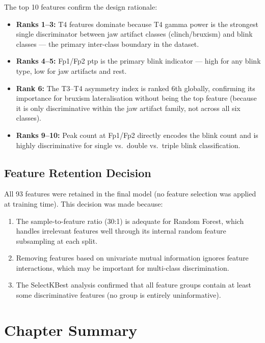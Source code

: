 The top 10 features confirm the design rationale:

\begin{itemize}[leftmargin=*]
    \item \textbf{Ranks 1--3:} T4 features dominate because
    T4 gamma power is the strongest single discriminator
    between jaw artifact classes (clinch/bruxism) and blink
    classes — the primary inter-class boundary in the dataset.
    \item \textbf{Ranks 4--5:} Fp1/Fp2 \acrshort{ptp} is
    the primary blink indicator — high for any blink type,
    low for jaw artifacts and rest.
    \item \textbf{Rank 6:} The T3--T4 asymmetry index is
    ranked 6th globally, confirming its importance for
    bruxism lateralisation without being the top feature
    (because it is only discriminative within the jaw
    artifact family, not across all six classes).
    \item \textbf{Ranks 9--10:} Peak count at Fp1/Fp2
    directly encodes the blink count and is highly
    discriminative for single vs.\ double vs.\ triple
    blink classification.
\end{itemize}

\subsection{Feature Retention Decision}

All 93 features were retained in the final model (no
feature selection was applied at training time). This
decision was made because:

\begin{enumerate}[leftmargin=*]
    \item The sample-to-feature ratio (30:1) is adequate
    for Random Forest, which handles irrelevant features
    well through its internal random feature subsampling
    at each split.
    \item Removing features based on univariate mutual
    information ignores feature interactions, which may
    be important for multi-class discrimination.
    \item The SelectKBest analysis confirmed that all
    feature groups contain at least some discriminative
    features (no group is entirely uninformative).
\end{enumerate}

\section{Chapter Summary}
\label{sec:fe_summary}

